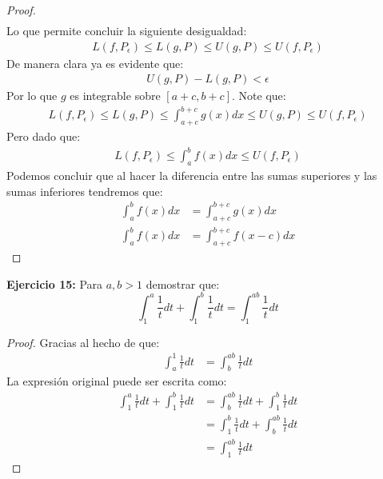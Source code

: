 \documentclass[../../main.tex]{subfiles}
\begin{document}
\begin{proof}
\begin{align*}
    \end{align*}
    Lo que permite concluir la siguiente desigualdad:
    \begin{align*}
        L(f, P_\epsilon) \le L(g, P) \le U(g, P) \le U(f, P_\epsilon)
    \end{align*}
    De manera clara ya es evidente que:
    \begin{align*}
        U(g, P) - L(g, P) < \epsilon
    \end{align*}
    Por lo que $g$ es integrable sobre $[a+c, b+c]$. Note que:
    \begin{align*}
        L(f, P_\epsilon) \le L(g, P) \le \int_{a+c}^{b+c} g(x) dx \le U(g, P) \le U(f, P_\epsilon)
    \end{align*}
    Pero dado que:
    \begin{align*}
        L(f, P_\epsilon) \le \int_{a}^b f(x) dx \le U(f, P_\epsilon)
    \end{align*}
    Podemos concluir que al hacer la diferencia entre las sumas superiores y las sumas inferiores tendremos que:
    \begin{align*}
        \int_a^b f(x) dx &= \int_{a+c}^{b+c} g(x) dx\\
        \int_a^b f(x) dx &= \int_{a+c}^{b+c} f(x-c) dx
    \end{align*}
\end{proof}

\question \textbf{Ejercicio 15:} Para $a, b > 1$ demostrar que:
$$ \int_1^a \frac{1}{t} dt + \int_1^b \frac{1}{t} dt = \int_1^{ab} \frac{1}{t} dt$$
\begin{proof}
    Gracias al hecho de que:
    \begin{align*}
        \int_a^1 \frac{1}{t} dt &= \int_b^{ab} \frac{1}{t} dt
    \end{align*}
    La expresión original puede ser escrita como:
    \begin{align*}
        \int_1^a \frac{1}{t} dt + \int_1^b \frac{1}{t} dt  &= \int_b^{ab} \frac{1}{t} dt + \int_1^b \frac{1}{t} dt\\
        &= \int_1^b \frac{1}{t} dt + \int_b^{ab} \frac{1}{t} dt\\
        &= \int_1^{ab} \frac{1}{t} dt
    \end{align*}
\end{proof}
\end{document}
